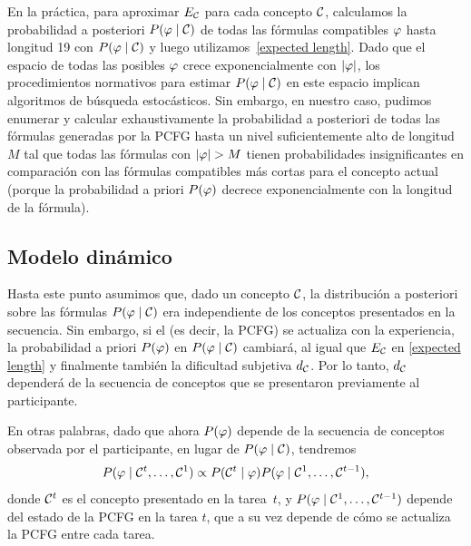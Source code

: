 En la práctica, para aproximar $E_{\mathcal{C}}$ para cada concepto $\mathcal{C}$, calculamos la probabilidad a posteriori $P(\varphi\mid \mathcal{C})$ de todas las fórmulas compatibles $\varphi$ hasta longitud 19 con $P(\varphi\mid \mathcal{C})$ y luego utilizamos~\eqref{expected length}. Dado que el espacio de todas las posibles $\varphi$ crece exponencialmente con $|\varphi|$, los procedimientos normativos para estimar $P(\varphi\mid \mathcal{C})$ en este espacio implican algoritmos de búsqueda estocásticos. Sin embargo, en nuestro caso, pudimos enumerar y calcular exhaustivamente la probabilidad a posteriori de todas las fórmulas generadas por la PCFG hasta un nivel suficientemente alto de longitud $M$ tal que todas las fórmulas con $|\form|>M$ tienen probabilidades insignificantes en comparación con las fórmulas compatibles más cortas para el concepto actual (porque la probabilidad a priori $P(\varphi)$ decrece exponencialmente con la longitud de la fórmula).

\subsection{Modelo dinámico}


Hasta este punto asumimos que, dado un concepto $\mathcal{C}$, la distribución a posteriori sobre las fórmulas $P(\varphi\mid \mathcal{C})$ era independiente de los conceptos presentados en la secuencia. Sin embargo, si el \lot (es decir, la PCFG) se actualiza con la experiencia, la probabilidad a priori $P(\varphi)$ en $P(\varphi\mid \mathcal{C})$ cambiará, al igual que $E_{\mathcal{C}}$ en \eqref{expected length} y finalmente también la dificultad subjetiva $d_{\mathcal{C}}$. Por lo tanto, $d_{\mathcal{C}}$ dependerá de la secuencia de conceptos que se presentaron previamente al participante.

En otras palabras, dado que ahora $P(\varphi)$ depende de la secuencia de conceptos observada por el participante, en lugar de $P(\varphi\mid \mathcal{C})$, tendremos 
$$
P(\varphi\mid \mathcal{C}^{t},\dots,\mathcal{C}^{1}) \propto P(\mathcal{C}^{t}\mid \varphi)P(\varphi\mid \mathcal{C}^{1},\dots,\mathcal{C}^{t-1}),
$$ 
%
donde $\mathcal{C}^{t}$ es el concepto presentado en la tarea~$t$, y $P(\varphi\mid \mathcal{C}^{1},\dots,\mathcal{C}^{t-1})$ depende del estado de la PCFG en la tarea $t$, que a su vez depende de cómo se actualiza la PCFG entre cada tarea.

